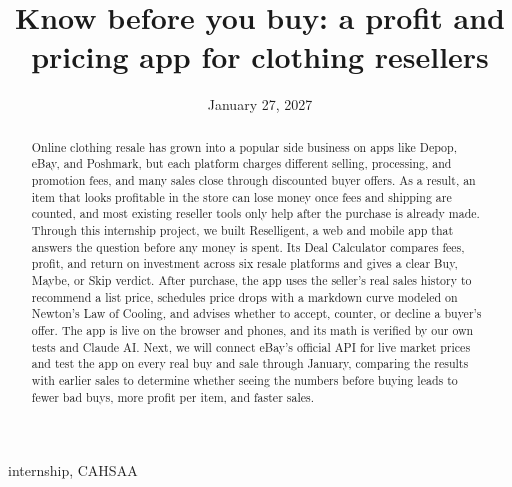 \documentclass[12pt,conference,onecolumn]{IEEEtran}
\title{Know before you buy: a profit and pricing app for clothing resellers}
\author{%
\IEEEauthorblockN{Blaise Demairo}\IEEEauthorblockA{Science \& Engineering\\Manalapan High School\\Englishtown, NJ\\\href{mailto:427mreznik@frhsd.com}{427mreznik@frhsd.com}}\and
\IEEEauthorblockN{Ethan Sobel}\IEEEauthorblockA{Science \& Engineering\\Manalapan High School\\Englishtown, NJ\\\href{mailto:427ssanrkitya@frhsd.com}{427ssankritya@frhsd.com}}
}
\date{January 27, 2027}
\newcommand{\keywords}{internship, CAHSAA}
\begin{document}
\maketitle 

\begin{abstract}
Online clothing resale has grown into a popular side business on apps like Depop, eBay, and Poshmark, but each platform charges different selling, processing, and promotion fees, and many sales close through discounted buyer offers. As a result, an item that looks profitable in the store can lose money once fees and shipping are counted, and most existing reseller tools only help after the purchase is already made. Through this internship project, we built Reselligent, a web and mobile app that answers the question before any money is spent. Its Deal Calculator compares fees, profit, and return on investment across six resale platforms and gives a clear Buy, Maybe, or Skip verdict. After purchase, the app uses the seller’s real sales history to recommend a list price, schedules price drops with a markdown curve modeled on Newton’s Law of Cooling, and advises whether to accept, counter, or decline a buyer’s offer. The app is live on the browser and phones, and its math is verified by our own tests and Claude AI. Next, we will connect eBay’s official API for live market prices and test the app on every real buy and sale through January, comparing the results with earlier sales to determine whether seeing the numbers before buying leads to fewer bad buys, more profit per item, and faster sales.
\end{abstract}

\begin{IEEEkeywords}
\keywords
\end{IEEEkeywords}
\end{document}
